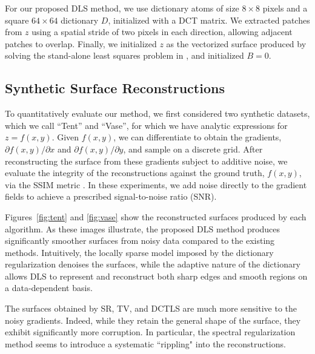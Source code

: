For our proposed DLS method, we use dictionary atoms of size $8 \times 8$ pixels and a square $64 \times 64$ dictionary $D$, initialized with a DCT matrix. We extracted patches from $z$ using a spatial stride of two pixels in each direction, allowing adjacent patches to overlap. Finally, we initialized $z$ as the vectorized surface produced by solving the stand-alone least squares problem in \cite{simchony1990}, and initialized $B = 0$.

\subsection{Synthetic Surface Reconstructions}
To quantitatively evaluate our method, we first considered two synthetic datasets, which we call ``Tent'' and ``Vase'', for which we have analytic expressions for $z = f(x,y)$. Given $f(x,y)$, we can differentiate to obtain the gradients, $\partial f(x,y) / \partial x$ and $\partial f(x,y) / \partial y$, and sample on a discrete grid. After reconstructing the surface from these gradients subject to additive noise, we evaluate the integrity of the reconstructions against the ground truth, $f(x,y)$, via the SSIM metric \cite{wang2004}. In these experiments, we add noise directly to the gradient fields to achieve a prescribed signal-to-noise ratio (SNR).

Figures~\ref{fig:tent} and \ref{fig:vase} show the reconstructed surfaces produced by each algorithm. As these images illustrate, the proposed DLS method produces significantly smoother surfaces from noisy data compared to the existing methods. Intuitively, the locally sparse model imposed by the dictionary regularization denoises the surfaces, while the adaptive nature of the dictionary allows DLS to represent and reconstruct both sharp edges and smooth regions on a data-dependent basis.

The surfaces obtained by SR, TV, and DCTLS are much more sensitive to the noisy gradients. Indeed, while they retain the general shape of the surface, they exhibit significantly more corruption. In particular, the spectral regularization method seems to introduce a systematic ``rippling" into the reconstructions.
\vspace{2mm}

